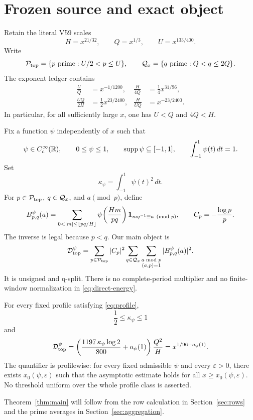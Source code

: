 \section{Frozen source and exact object}
\label{sec:setup}

Retain the literal V59 scales
\begin{equation}
 H=x^{21/32},\qquad Q=x^{1/3},\qquad U=x^{133/400}.
 \label{eq:scales}
\end{equation}
Write
\[
 \mathcal{P}_{\mathrm{top}}=\{p\ \text{prime}:U/2<p\leq U\},\qquad
 \mathcal{Q}_x=\{q\ \text{prime}:Q<q\leq2Q\}.
\]
The exponent ledger contains
\begin{align}
 \frac{U}{Q}&=x^{-1/1200}, &
 \frac{H}{4Q}&=\frac14x^{31/96}, \label{eq:separation}\\
 \frac{UQ}{2H}&=\frac12x^{23/2400}, &
 \frac{H}{UQ}&=x^{-23/2400}.       \label{eq:depth}
\end{align}
In particular, for all sufficiently large $x$, one has $U<Q$ and $4Q<H$.

Fix a function $\psi$ independently of $x$ such that
\begin{equation}
 \psi\in C_c^\infty(\mathbb{R}),\qquad 0\leq\psi\leq1,\qquad
 \operatorname{supp}\psi\subseteq[-1,1],\qquad
 \int_{-1}^{1}\psi(t)\,dt=1.
 \label{eq:profile}
\end{equation}
Set
\begin{equation}
 \kappa_\psi=\int_{-1}^{1}\psi(t)^2\,dt.
 \label{eq:kappa}
\end{equation}
For $p\in\mathcal{P}_{\mathrm{top}}$, $q\in\mathcal{Q}_x$, and $a\pmod p$, define
\begin{equation}
 B_{p,q}^{\psi}(a)=
 \sum_{0<|m|\leq\lfloor pq/H\rfloor}
 \psi\!\left(\frac{Hm}{pq}\right)
 \one_{m q^{-1}\equiv a\pmod p},
 \qquad C_p=-\frac{\log p}{p}.
 \label{eq:row}
\end{equation}
The inverse is legal because $p<q$.  Our main object is
\begin{equation}
 \mathcal{D}_{\mathrm{top}}^{\psi}=
 \sum_{p\in\mathcal{P}_{\mathrm{top}}}|C_p|^2
 \sum_{q\in\mathcal{Q}_x}
 \sum_{\substack{a\bmod p\\(a,p)=1}}
 |B_{p,q}^{\psi}(a)|^2.
 \label{eq:direct-energy}
\end{equation}
It is unsigned and q-split.  There is no complete-period multiplier and no
finite-window normalization in \eqref{eq:direct-energy}.

\begin{theorem}
\label{thm:main}
For every fixed profile satisfying \eqref{eq:profile},
\begin{equation}
 \frac12\leq\kappa_\psi\leq1
 \label{eq:kappa-range}
\end{equation}
and
\begin{equation}
 \mathcal{D}_{\mathrm{top}}^{\psi}=
 \left(\frac{1197\,\kappa_\psi\log2}{800}+o_\psi(1)\right)
 \frac{Q^2}{H}
 =x^{1/96+o_\psi(1)}.
 \label{eq:main-asymptotic}
\end{equation}
The quantifier is profilewise: for every fixed admissible $\psi$ and every
$\varepsilon>0$, there exists $x_0(\psi,\varepsilon)$ such that the
asymptotic estimate holds for all $x\geq x_0(\psi,\varepsilon)$.  No threshold
uniform over the whole profile class is asserted.
\end{theorem}

Theorem~\ref{thm:main} will follow from the row calculation in
Section~\ref{sec:rows} and the prime averages in
Section~\ref{sec:aggregation}.
